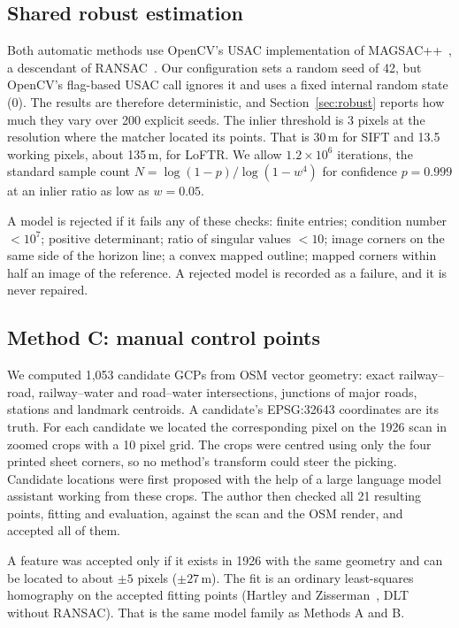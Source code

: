 \documentclass[10pt,twocolumn]{article}
\newcommand{\metre}{\,m}
\begin{document}
\subsection{Shared robust estimation}
Both automatic methods use OpenCV's USAC implementation of MAGSAC++~\citep{barath2020magsacpp}, a descendant of RANSAC~\citep{fischler1981ransac}. Our configuration sets a random seed of 42, but OpenCV's flag-based USAC call ignores it and uses a fixed internal random state (0). The results are therefore deterministic, and Section~\ref{sec:robust} reports how much they vary over 200 explicit seeds. The inlier threshold is 3 pixels at the resolution where the matcher located its points. That is 30\metre{} for SIFT and 13.5 working pixels, about 135\metre, for LoFTR. We allow $1.2\times10^6$ iterations, the standard sample count $N=\log(1-p)/\log(1-w^4)$ for confidence $p=0.999$ at an inlier ratio as low as $w=0.05$.

A model is rejected if it fails any of these checks: finite entries; condition number $<10^7$; positive determinant; ratio of singular values $<10$; image corners on the same side of the horizon line; a convex mapped outline; mapped corners within half an image of the reference. A rejected model is recorded as a failure, and it is never repaired.

\subsection{Method C: manual control points}
We computed 1{,}053 candidate GCPs from OSM vector geometry: exact railway--road, railway--water and road--water intersections, junctions of major roads, stations and landmark centroids. A candidate's EPSG:32643 coordinates are its truth. For each candidate we located the corresponding pixel on the 1926 scan in zoomed crops with a 10 pixel grid. The crops were centred using only the four printed sheet corners, so no method's transform could steer the picking. Candidate locations were first proposed with the help of a large language model assistant working from these crops. The author then checked all 21 resulting points, fitting and evaluation, against the scan and the OSM render, and accepted all of them.

A feature was accepted only if it exists in 1926 with the same geometry and can be located to about $\pm5$ pixels ($\pm27$\metre). The fit is an ordinary least-squares homography on the accepted fitting points (Hartley and Zisserman~\citep{hartley2004mvg}, DLT without RANSAC). That is the same model family as Methods A and B.
\end{document}
